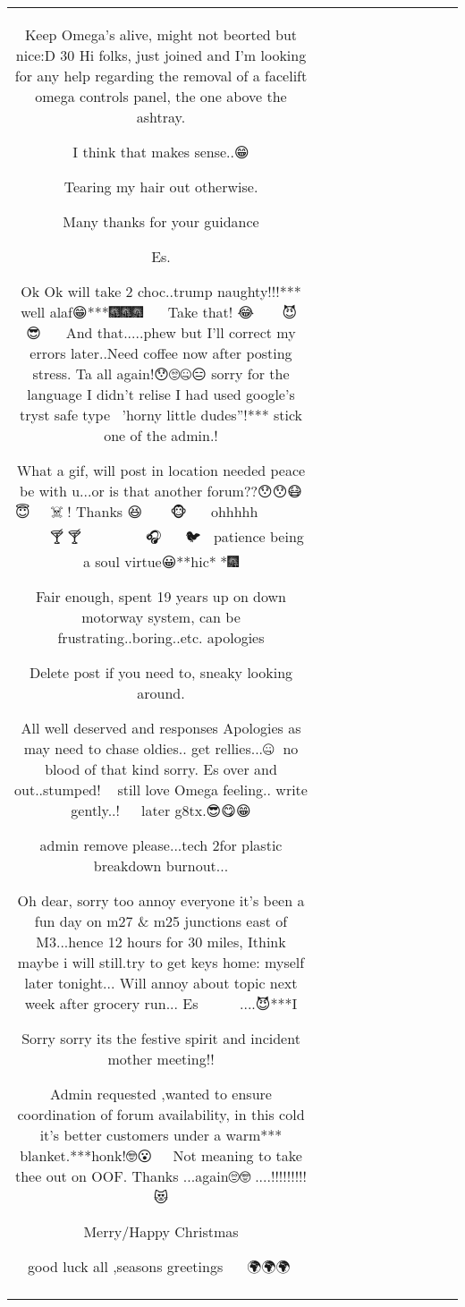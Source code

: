 \begin{table}[h!]
\begin{tabular}{|c|c|c|c|c|c|c|c|c|c|c|}
Keep Omega's alive, might not beorted but nice:D
30
Hi folks, just joined and I'm looking for any help regarding the removal of a facelift omega controls panel, the one above the ashtray.

I think that makes sense..😁

Tearing my hair out otherwise.


Many thanks for your guidance


Es.    

Ok Ok will take 2 choc..trump naughty!!!*** well alaf😁***🎆🎆🎆🎄🐼🐼🐼🐼
Take that!
😂🎂🎉🍺🍷🤔🤔💀😈🤢😎🤪🤯🤔🤩🤐
And that.....phew but I'll correct my errors later..Need coffee now after posting stress. Ta all again!😯🙄🤐😑 sorry for the language I didn't relise I had used google's tryst safe type🤔😧😱'horny little dudes''!*** stick one of the admin.!

What a gif, will post in location needed peace be with u...or is that another forum??😯😯😷😇🐼🐔🐔🐔💀☠️🐀! Thanks 😆🐧🤠👻🐲🐍🐢🐢🐵🎃🎄🎅🎷🎉🤓ohhhhh 🐼🐼🐼😆🐶😷🤐😨🤠🙈🙉🙈🥑🙄🍰🍺🍺🍺🍾🍸🥃🍸🐌🐅🐷🐱🐔🐵🐽🐯🐲🐧🍾🎺😂🎺🎺😁🎧🇭🇰😧🌋😲🐨🐦🎈🥂 patience being a soul virtue😀**hic*🍴*🎆

Fair enough, spent 19 years up on down motorway system, can be frustrating..boring..etc. apologies

Delete post if you need to, sneaky looking around.

All well deserved and responses
Apologies as may need to chase oldies.. get rellies...🤐🤔 no blood of that kind sorry. 
Es over and out..stumped!🤕😯🤓 still love Omega feeling..  write gently..! 🤔😧😇 later g8tx.😎😋😁






admin remove please...tech 2for plastic breakdown burnout... 

Oh dear, sorry too annoy everyone it's been a fun day on m27 \& m25 junctions east of M3...hence 12 hours for 30 miles, Ithink maybe i will still.try to get keys home: myself later tonight...
Will annoy about topic next week after grocery run...
Es 🤔💀😇             🍾🤯🤣😓🙄....😈***I

Sorry sorry its the festive spirit and incident mother meeting!!


Admin requested ,wanted to ensure coordination of forum availability, in this cold it's better customers under a warm*** blanket.***honk!🤓😮👻🐲🐲🥂
Not meaning to take thee out on OOF.
Thanks ...again🙄🤓🏴....!!!!!!!!!😻

Merry/Happy Christmas

good luck all ,seasons greetings🎄🎄🎄🎄😇😁🌍🌍🌍🍻


\end{tabular}
\end{table}
